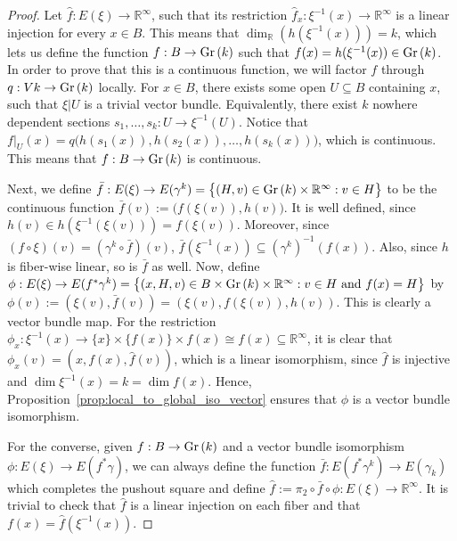 \begin{proof} Let $\hat{f}:E(\xi)\to\mathbb{R}^{\infty}$, such that its restriction $\hat{f}_x:\xi^{-1}(x)\to\mathbb{R}^{\infty}$ is a linear injection for every $x\in B$. This means that $\dim_{\mathbb{R}}(h(\xi^{-1}(x)))=k$, which lets us define the function $f:B\to\Gr{k}$ such that $f(x)=h(\xi^{-1}(x))\in\Gr{k}$. In order to prove that this is a continuous function, we will factor $f$ through $q:V{k}\to\Gr{k}$ locally. For $x\in B$, there exists some open $U\subseteq B$ containing $x$, such that $\xi|U$ is a trivial vector bundle. Equivalently, there exist $k$ nowhere dependent sections $s_1,\ldots,s_k:U\to\xi^{-1}(U)$. Notice that $f|_U(x)=q\big(h(s_1(x)),h(s_2(x)),\ldots,h(s_k(x))\big)$, which is continuous. This means that $f:B\to\Gr{k}$ is continuous.

Next, we define $\bar{f}:E(\xi)\to E(\gamma^k)=\big\{(H,v)\in\Gr{k}\times\mathbb{R}^{\infty}:v\in H\big\}$ to be the continuous function $\bar{f}(v):=\big(f(\xi(v)),h(v)\big)$. It is well defined, since $h(v)\in h(\xi^{-1}(\xi(v)))=f(\xi(v))$. Moreover, since $(f\circ\xi)(v)=(\gamma^k\circ\bar{f})(v)$, $\bar{f}(\xi^{-1}(x))\subseteq(\gamma^k)^{-1}(f(x))$. Also, since $h$ is fiber-wise linear, so is $\bar{f}$ as well. Now, define $\phi:E(\xi)\to E(f^*\gamma^k)=\big\{(x,H,v)\in B\times\Gr{k}\times\mathbb{R}^{\infty}:v\in H\text{ and }f(x)=H\big\}$ by $\phi(v):=(\xi(v),\bar{f}(v))=(\xi(v),f(\xi(v)),h(v))$. This is clearly a vector bundle map. For the restriction $\phi_x:\xi^{-1}(x)\to\{x\}\times\{f(x)\}\times f(x)\cong f(x)\subseteq\mathbb{R}^{\infty}$, it is clear that $\phi_x(v)=(x,f(x),\hat{f}(v))$, which is a linear isomorphism, since $\hat{f}$ is injective and $\dim\xi^{-1}(x)=k=\dim f(x)$. Hence, Proposition~\ref{prop:local_to_global_iso_vector} ensures that $\phi$ is a vector bundle isomorphism.

For the converse, given $f:B\to\Gr{k}$ and a vector bundle isomorphism $\phi:E(\xi)\to E(f^*\gamma)$, we can always define the function $\bar{f}:E(f^*\gamma^k)\to E(\gamma_k)$ which completes the pushout square and define $\hat{f}:=\pi_2\circ\bar{f}\circ\phi:E(\xi)\to\mathbb{R}^{\infty}$. It is trivial to check that $\hat{f}$ is a linear injection on each fiber and that $f(x)=\hat{f}(\xi^{-1}(x))$.
\end{proof}

